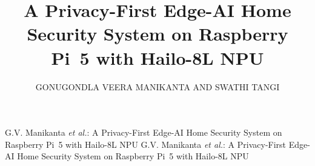\documentclass{ieeeaccess}
\begin{document}
\history{}
\doi{}

\title{A Privacy-First Edge-AI Home Security System on Raspberry Pi~5 with Hailo-8L NPU}
\author{\uppercase{Gonugondla Veera Manikanta} \uppercase{and Swathi Tangi}}

\address[1]{Department of Electrical and Electronics Engineering, Manipal Institute of Technology, Manipal Academy of Higher Education, Manipal, Karnataka, India (e-mail: manikantagonugondla@gmail.com; swathi.tangi@manipal.edu)}

\markboth
{G.V. Manikanta \emph{et al.}: A Privacy-First Edge-AI Home Security System on Raspberry Pi~5 with Hailo-8L NPU}
{G.V. Manikanta \emph{et al.}: A Privacy-First Edge-AI Home Security System on Raspberry Pi~5 with Hailo-8L NPU}

\end{document}
